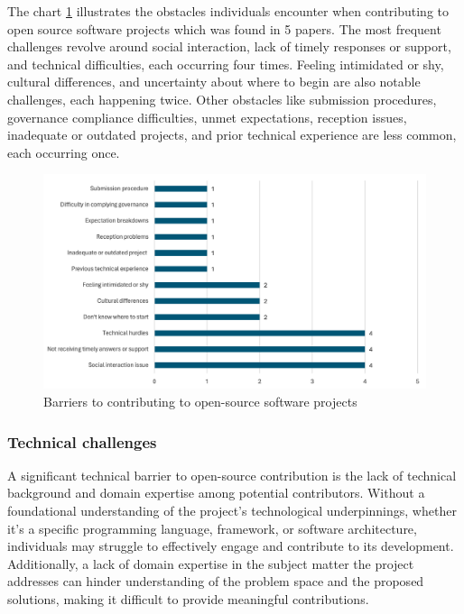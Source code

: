 The chart \ref{fig:barriers} illustrates the obstacles individuals encounter when contributing to open source software projects which was found in 5 papers. The most frequent challenges revolve around social interaction, lack of timely responses or support, and technical difficulties, each occurring four times. Feeling intimidated or shy, cultural differences, and uncertainty about where to begin are also notable challenges, each happening twice. Other obstacles like submission procedures, governance compliance difficulties, unmet expectations, reception issues, inadequate or outdated projects, and prior technical experience are less common, each occurring once.

\begin{figure}[ht]
    \centering
    \includegraphics[width=1\linewidth]{figs/barriers.png}
    \caption{Barriers to contributing to open-source software projects}
    \label{fig:barriers}
\end{figure}



\subsubsection{Technical challenges}

A significant technical barrier to open-source contribution is the lack of technical background and domain expertise among potential contributors. Without a foundational understanding of the project's technological underpinnings, whether it's a specific programming language, framework, or software architecture, individuals may struggle to effectively engage and contribute to its development. Additionally, a lack of domain expertise in the subject matter the project addresses can hinder understanding of the problem space and the proposed solutions, making it difficult to provide meaningful contributions.


